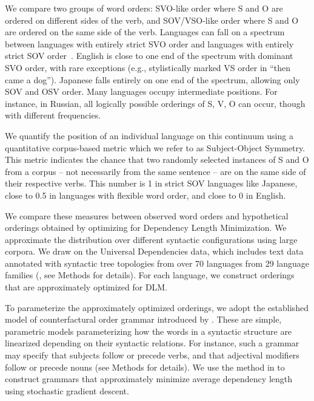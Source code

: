 \documentclass[11pt,a4paper]{article}
\newcommand\mhahn[1]{{\color{red}(#1)}}
\begin{document}


We compare two groups of word orders: SVO-like order where S and O are ordered on different sides of the verb, and SOV/VSO-like order where S and O are ordered on the same side of the verb.
Languages can fall on a spectrum between languages with entirely strict SVO order and languages with entirely strict SOV order~\citep{steele1978word}.
English is close to one end of the spectrum with dominant SVO order, with rare exceptions (e.g., stylistically marked VS order in ``then came a dog'').
Japanese falls entirely on one end of the spectrum, allowing only SOV and OSV order.
Many languages occupy intermediate positions. 
For instance, in Russian, all logically possible orderings of S, V, O can occur, though with different frequencies.

We quantify the position of an individual language on this continuum using a quantitative corpus-based metric which we refer to as Subject-Object Symmetry.
This metric indicates the chance that two randomly selected instances of S and O from a corpus -- not necessarily from the same sentence -- are on the same side of their respective verbs. This number is 1 in strict SOV languages like Japanese, close to 0.5 in languages with flexible word order, and close to 0 in English.



We compare these measures between observed word orders and hypothetical orderings obtained by optimizing for Dependency Length Minimization. We approximate the distribution over different syntactic configurations using large corpora.
We draw on the Universal Dependencies data, which includes text data annotated with syntactic tree topologies from over 70 languages from 29 language families (\citep{zeman2020universal}, see Methods for details).
For each language, we construct orderings that are approximately optimized for DLM.

To parameterize the approximately optimized orderings, we adopt the established model of counterfactural order grammar introduced by \citet{gildea-optimizing-2007}.
These are simple, parametric models parameterizing how the words in a syntactic structure are linearized depending on their syntactic relations.
For instance, such a grammar may specify that subjects follow or precede verbs, and that adjectival modifiers follow or precede nouns (see Methods for details).
We use the method in \citet{hahn2020universals} to construct grammars that approximately minimize average dependency length using stochastic gradient descent.
\end{document}
